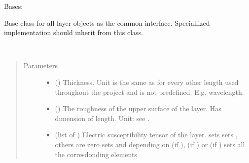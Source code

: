 \documentclass[letterpaper,10pt,english]{sphinxmanual}
\begin{document}
\begin{fulllineitems}
\label{\detokenize{modules-api/samplerepresentation:SampleRepresentation.LayerObject}}
Bases: 

Base class for all layer objects as the common interface. Speciallized implementation should inherit from this class.

\begin{fulllineitems}
\label{\detokenize{modules-api/samplerepresentation:SampleRepresentation.LayerObject.__init__}}~\begin{quote}\begin{description}
\item[{Parameters}] \leavevmode\begin{itemize}
\item {} 
 ({\hyperref[\detokenize{modules-api/parameters:Parameters.Parameter}]{}}) \textendash{} Thickness. Unit is the same as for every other length used throughout the project and is not predefined. E.g. wavelength.

\item {} 
 ({\hyperref[\detokenize{modules-api/parameters:Parameters.Parameter}]{}}) \textendash{} The roughness of the upper surface of the layer. Has dimension of length. Unit: see .

\item {} 
 (list of {\hyperref[\detokenize{modules-api/parameters:Parameters.Parameter}]{}}) \textendash{} Electric susceptibility tensor of the layer.
\textbar{} \sphinxstyleemphasis{{[}chi{]}} sets 
\textbar{}  sets , others are zero
\textbar{}  sets   and depending on   (if ),  (if ) or  (if )
\textbar{}  sets all the corresdonding elements


\end{itemize}
\end{description}
\end{quote}
\end{fulllineitems}
\end{fulllineitems}
\end{document}
